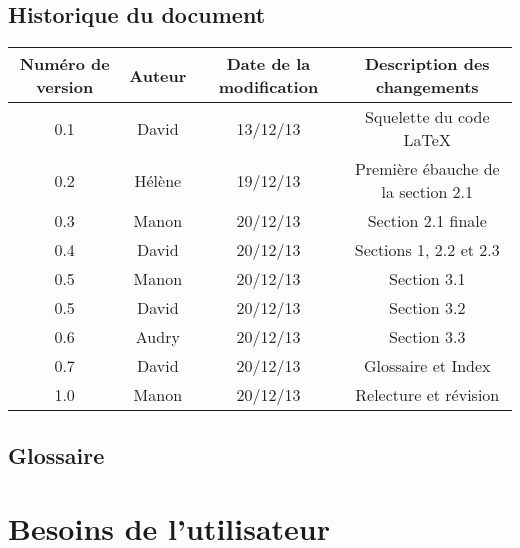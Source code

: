 \documentclass[a4paper,titlepage]{scrreprt}
\begin{document}
\section{Historique du document}
  \begin{tabular}{|c|c|c|c|}
    \hline
    Numéro de version & Auteur & Date de la modification & Description des changements \\
    \hline
    0.1 & David & 13/12/13 & Squelette du code \LaTeX \\
    0.2 & Hélène & 19/12/13 & Première ébauche de la section 2.1 \\
    0.3 & Manon & 20/12/13 & Section 2.1 finale \\
    0.4 & David & 20/12/13 & Sections 1,  2.2 et 2.3 \\
    0.5 & Manon & 20/12/13 & Section 3.1 \\
    0.5 & David & 20/12/13 & Section 3.2 \\
    0.6 & Audry & 20/12/13 & Section 3.3 \\
    0.7 & David & 20/12/13 & Glossaire et Index \\
    1.0 & Manon & 20/12/13 & Relecture et révision \\
    \hline
  \end{tabular}


\section{Glossaire}
  \removepagebreak
  \printglossaries
  \restorepagebreak
\chapter{Besoins de l'utilisateur}
  
  
\end{document}
